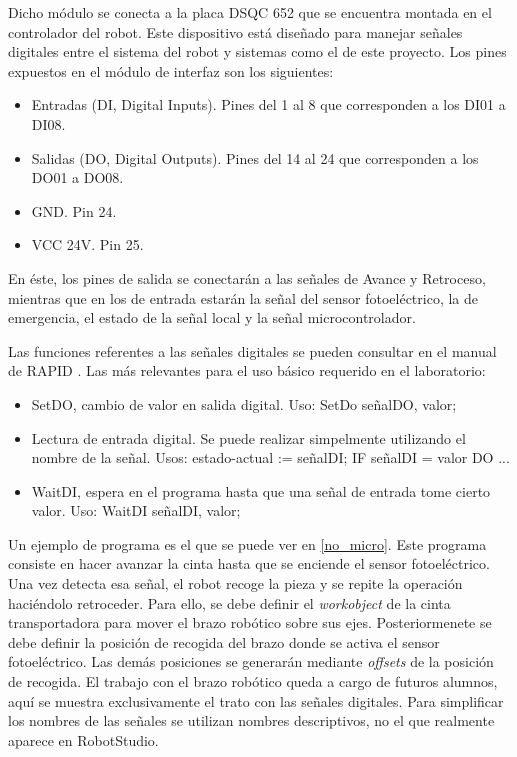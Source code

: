 Dicho módulo se conecta a la placa DSQC 652 que se encuentra montada en el controlador del robot.
Este dispositivo está diseñado para manejar señales digitales entre el sistema del robot y sistemas
como el de este proyecto. Los pines expuestos en el módulo de interfaz son los siguientes:
\begin{itemize}
    \item Entradas (DI, Digital Inputs). Pines del 1 al 8 que corresponden a los DI01 a DI08.
    \item Salidas (DO, Digital Outputs). Pines del 14 al 24 que corresponden a los DO01 a DO08.
    \item GND. Pin 24.
    \item VCC 24V. Pin 25.
\end{itemize}

En éste, los pines de salida se conectarán a las señales de Avance y Retroceso, mientras que en los de entrada estarán la señal del sensor fotoeléctrico, la de emergencia, el estado de la señal local y la señal microcontrolador.

Las funciones referentes a las señales digitales se pueden consultar en el manual de RAPID \cite{rapid}.
Las más relevantes para el uso básico requerido en el laboratorio:
\begin{itemize}
    \item SetDO, cambio de valor en salida digital. Uso: SetDo señalDO, valor;
    \item Lectura de entrada digital. Se puede realizar simpelmente utilizando el nombre de la señal. 
    Usos: estado-actual := señalDI; IF señalDI = valor DO ...
    \item WaitDI, espera en el programa hasta que una señal de entrada tome cierto valor.
    Uso: WaitDI señalDI, valor;
\end{itemize}

Un ejemplo de programa es el que se puede ver en \ref{no_micro}. Este programa consiste en hacer avanzar
la cinta hasta que se enciende el sensor fotoeléctrico.
Una vez detecta esa señal, el robot recoge la pieza y se repite la operación 
haciéndolo retroceder. Para ello, se debe definir el \textit{workobject} de la cinta transportadora para mover
el brazo robótico sobre sus ejes. Posteriormenete se debe definir la posición de recogida del brazo donde 
se activa el sensor fotoeléctrico. Las demás posiciones se generarán mediante \emph{offsets} de la posición de recogida.
El trabajo con el brazo robótico queda a cargo de futuros alumnos, aquí se muestra exclusivamente el trato 
con las señales digitales. Para simplificar los nombres de las señales se utilizan nombres descriptivos, no
el que realmente aparece en RobotStudio.

